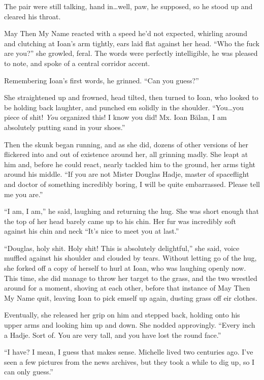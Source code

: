 The pair were still talking, hand in\ldots well, paw, he supposed, so he stood up and cleared his throat.

May Then My Name reacted with a speed he'd not expected, whirling around and clutching at Ioan's arm tightly, ears laid flat against her head. ``Who the fuck are you?'' she growled, feral. The words were perfectly intelligible, he was pleased to note, and spoke of a central corridor accent.

Remembering Ioan's first words, he grinned. ``Can you guess?''

She straightened up and frowned, head tilted, then turned to Ioan, who looked to be holding back laughter, and punched em solidly in the shoulder. ``You\ldots you piece of shit! \emph{You} organized this! I know you did! Mx. Ioan Bălan, I am absolutely putting sand in your shoes.''

Then the skunk began running, and as she did, dozens of other versions of her flickered into and out of existence around her, all grinning madly. She leapt at him and, before he could react, nearly tackled him to the ground, her arms tight around his middle. ``If you are not Mister Douglas Hadje, master of spaceflight and doctor of something incredibly boring, I will be quite embarrassed. Please tell me you are.''

``I am, I am,'' he said, laughing and returning the hug. She was short enough that the top of her head barely came up to his chin. Her fur was incredibly soft against his chin and neck ``It's nice to meet you at last.''

``Douglas, holy shit. Holy shit! This is absolutely delightful,'' she said, voice muffled against his shoulder and clouded by tears. Without letting go of the hug, she forked off a copy of herself to hurl at Ioan, who was laughing openly now. This time, she did manage to throw her target to the grass, and the two wrestled around for a moment, shoving at each other, before that instance of May Then My Name quit, leaving Ioan to pick emself up again, dusting grass off eir clothes.

Eventually, she released her grip on him and stepped back, holding onto his upper arms and looking him up and down. She nodded approvingly. ``Every inch a Hadje. Sort of. You are very tall, and you have lost the round face.''

``I have? I mean, I guess that makes sense. Michelle lived two centuries ago. I've seen a few pictures from the news archives, but they took a while to dig up, so I can only guess.''

